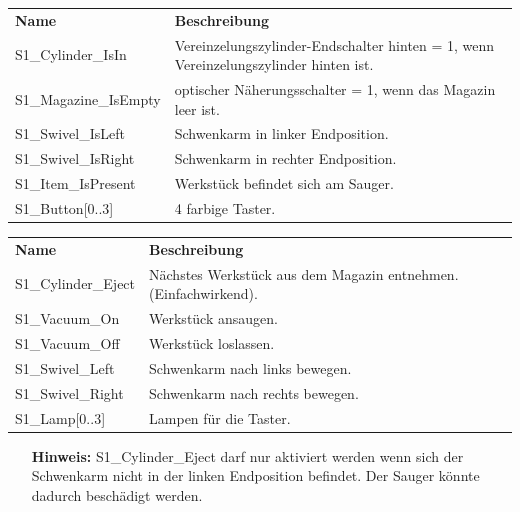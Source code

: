 \documentclass[11pt,a4paper,ngerman]{article}
\begin{document}
\begin{center}
  \setlength\extrarowheight{4pt}
  \small
  \begin{tabularx}{\textwidth}{|p{4cm}|X|}
  	\hline
  	\rowcolor{tublau}
  	\multicolumn{2}{|c|}{\bf \color{white} \large Sensoren}\\
  	\hline\hline
    \rowcolor{gray!80}
    \bf Name & \bf Beschreibung\\
    \hline\hline
    S1\_Cylinder\_IsIn &  Vereinzelungszylinder-Endschalter hinten = 1, wenn Vereinzelungszylinder hinten ist.\\
    S1\_Magazine\_IsEmpty & optischer Näherungsschalter = 1, wenn das Magazin leer ist.\\
    S1\_Swivel\_IsLeft & Schwenkarm in linker Endposition.\\
    S1\_Swivel\_IsRight & Schwenkarm in rechter Endposition.\\
    S1\_Item\_IsPresent & Werkstück befindet sich am Sauger.\\
    S1\_Button[0..3] & 4 farbige Taster.\\
    \hline
  \end{tabularx}

  \medskip
  
  \begin{tabularx}{\textwidth}{|p{4cm}|X|}
  	\hline
  	\rowcolor{tublau}
  	\multicolumn{2}{|c|}{\bf \color{white} \large Aktoren}\\
  	\hline\hline
    \rowcolor{gray!80}
    \bf Name & \bf Beschreibung\\
    \hline\hline
    S1\_Cylinder\_Eject & Nächstes Werkstück aus dem Magazin entnehmen. (Einfachwirkend).\\
    S1\_Vacuum\_On & Werkstück ansaugen.\\
    S1\_Vacuum\_Off & Werkstück loslassen.\\
    S1\_Swivel\_Left & Schwenkarm nach links bewegen.\\
    S1\_Swivel\_Right & Schwenkarm nach rechts bewegen.\\
    S1\_Lamp[0..3] & Lampen für die Taster.\\
    \hline
  \end{tabularx}
\end{center}

\begin{itemize}
	\item[\bf Hinweis:] S1\_Cylinder\_Eject darf nur aktiviert werden wenn sich der Schwenkarm nicht in der linken Endposition befindet. Der Sauger könnte dadurch beschädigt werden.
\end{itemize}
\end{document}
